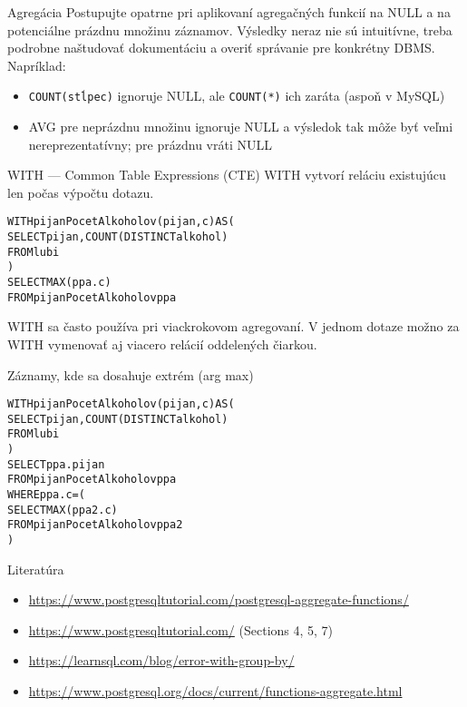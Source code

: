\documentclass[12pt]{beamer}
\def\blue#1{\textcolor{Cerulean}{#1}}
\begin{document}
\begin{frame}[fragile]{Agregácia}
Postupujte opatrne pri aplikovaní agregačných funkcií na NULL a na potenciálne prázdnu množinu záznamov.
Výsledky neraz nie sú intuitívne, treba podrobne naštudovať dokumentáciu a overiť správanie pre konkrétny DBMS.
Napríklad:
\begin{itemize}
\item \verb|COUNT(stĺpec)| ignoruje NULL, ale \verb|COUNT(*)| ich zaráta (aspoň v MySQL)
\item AVG pre neprázdnu množinu ignoruje NULL a výsledok tak môže byť veľmi nereprezentatívny; pre prázdnu vráti NULL
\end{itemize}
\end{frame}

\begin{frame}[fragile]{WITH --- Common Table Expressions (CTE)}
WITH vytvorí reláciu existujúcu len počas výpočtu dotazu.
\bigskip
\begin{alltt}
\alert{WITH} \blue{pijanPocetAlkoholov}(pijan, c) AS (
    SELECT pijan, COUNT(DISTINCT alkohol)
    FROM lubi
)
SELECT MAX(ppa.c)
FROM \blue{pijanPocetAlkoholov} ppa
\end{alltt}
\bigskip
WITH sa často používa pri viackrokovom agregovaní.
V jednom dotaze možno za WITH vymenovať aj viacero relácií oddelených čiarkou.
\end{frame}

\begin{frame}[fragile]{Záznamy, kde sa dosahuje extrém (arg max)}
\begin{alltt}
\alert{WITH} \blue{pijanPocetAlkoholov}(pijan, c) AS (
    SELECT pijan, COUNT(DISTINCT alkohol)
    FROM lubi
)
SELECT ppa.pijan
FROM \blue{pijanPocetAlkoholov} ppa
WHERE ppa.c = (
    SELECT MAX(ppa2.c)
    FROM \blue{pijanPocetAlkoholov} ppa2
)
\end{alltt}
\bigskip
\end{frame}


\begin{frame}{Literatúra}
\begin{itemize}
\item {\scriptsize\url{https://www.postgresqltutorial.com/postgresql-aggregate-functions/}}
\item {\scriptsize\url{https://www.postgresqltutorial.com/} (Sections 4, 5, 7)}
\item {\scriptsize\url{https://learnsql.com/blog/error-with-group-by/}}
\item {\scriptsize\url{https://www.postgresql.org/docs/current/functions-aggregate.html}}
\end{itemize}
\end{frame}
\end{document}
